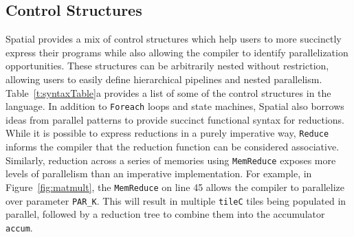 





\subsection{Control Structures}
\label{controls}

Spatial provides a mix of control structures which help users to more succinctly express their programs while also allowing the compiler to identify parallelization opportunities.
These structures can be arbitrarily nested without restriction, allowing users to easily define hierarchical pipelines and nested parallelism. Table~\ref{t:syntaxTable}a provides a list of some of the control structures in the language. In addition to \texttt{\small{Foreach}} loops and state machines, Spatial also borrows ideas 
from parallel patterns \cite{delite-tecs14, pldi13halide} to provide succinct functional syntax for reductions. 
While it is possible to express
reductions in a purely imperative way, \texttt{\small{Reduce}} informs the compiler that the 
reduction function can be considered associative. 
Similarly, reduction across a series of memories using \texttt{\small{MemReduce}} exposes more levels of parallelism than an imperative implementation.
For example, in Figure~\ref{fig:matmult}, the \texttt{\small{MemReduce}} on line 45 allows the compiler to parallelize over parameter \texttt{\small{PAR\_K}}. This will result in multiple \texttt{\small{tileC}} tiles being populated in parallel, followed by a reduction tree to combine them into the accumulator \texttt{\small{accum}}.

